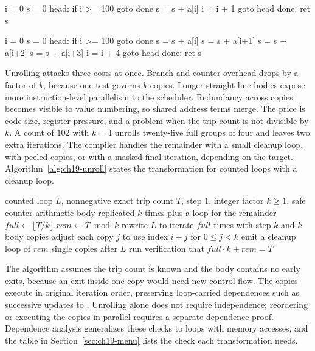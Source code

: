 \begin{irlisting}[caption={A simple accumulation loop with trip count one hundred.},label={lst:ch19-rolled}]
i = 0
s = 0
head: if i >= 100 goto done
      s = s + a[i]
      i = i + 1
      goto head
done: ret s
\end{irlisting}

\begin{irlisting}[caption={The same loop unrolled by four with no remainder.},label={lst:ch19-unrolled}]
i = 0
s = 0
head: if i >= 100 goto done
      s = s + a[i]
      s = s + a[i+1]
      s = s + a[i+2]
      s = s + a[i+3]
      i = i + 4
      goto head
done: ret s
\end{irlisting}

Unrolling attacks three costs at once.
Branch and counter overhead drops by a factor of $k$, because one test governs $k$ copies.
Longer straight-line bodies expose more instruction-level parallelism to the scheduler.
Redundancy across copies becomes visible to value numbering, so shared address terms merge.
The price is code size, register pressure, and a  problem when the trip count is not divisible by $k$.
A count of $102$ with $k = 4$ unrolls twenty-five full groups of four and leaves two extra iterations.
The compiler handles the remainder with a small cleanup loop, with peeled copies, or with a masked final iteration, depending on the target.
Algorithm~\ref{alg:ch19-unroll} states the transformation for counted loops with a cleanup loop.

\begin{algorithm}
  \caption{Unrolling a counted loop with a cleanup loop}\label{alg:ch19-unroll}
  \begin{pseudocode}
    \Require counted loop $L$, nonnegative exact trip count $T$, step $1$, integer factor $k\ge1$, safe counter arithmetic
    \Ensure body replicated $k$ times plus a loop for the remainder
    \State $full \gets \lfloor T / k \rfloor$
    \State $rem \gets T \bmod k$
    \State rewrite $L$ to iterate $full$ times with step $k$ and $k$ body copies
    \State adjust each copy $j$ to use index $i + j$ for $0 \le j < k$
    \State emit a cleanup loop of $rem$ single copies after $L$
    \State run verification that $full \cdot k + rem = T$
  \end{pseudocode}
\end{algorithm}

The algorithm assumes the trip count is known and the body contains no early exits, because an exit inside one copy would need new control flow.
The copies execute in original iteration order, preserving loop-carried dependences such as successive updates to .
Unrolling alone does not require independence; reordering or executing the copies in parallel requires a separate dependence proof.
Dependence analysis generalizes these checks to loops with memory accesses, and the table in Section~\ref{sec:ch19-menu} lists the check each transformation needs.

